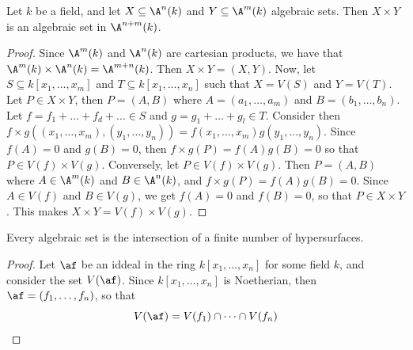 \begin{proposition}\label{1.2.4}
    Let $k$ be a field, and let  $X \subseteq \A^n(k)$ and $Y \subseteq \A^m(k)$
    algebraic sets. Then $X \times Y$ is an algebraic set in  $\A^{n+m}(k)$.
\end{proposition}
\begin{proof}
    Since $\A^m(k)$ and $\A^n(k)$ are cartesian products, we have that $\A^m(k)
    \times \A^n(k)=\A^{m+n}(k)$. Then $X \times Y=(X,Y)$. Now, let $S \subseteq
    k[x_1, \dots, x_m]$ and $T \subseteq k[x_1, \dots,x_n]$ such that $X=V(S)$
    and $Y=V(T)$. Let $P \in X \times Y$, then  $P=(A,B)$ where $A=(a_1, \dots,
    a_m)$ and $B=(b_1, \dots, b_n)$.  Let $f=f_1+\dots+f_d+\dots \in S$ and
    $g=g_1+\dots+g_l \in T$. Consider then $f \times
    g((x_1, \dots, x_m),(y_1, \dots, y_n))=f(x_1, \dots, x_m)g(y_1, \dots,
    y_n)$. Since $f(A)=0$ and $g(B)=0$, then $f \times g(P)=f(A)g(B)=0$ so that
    $P \in V(f) \times V(g)$. Conversely, let $P \in V(f) \times V(g)$. Then
    $P=(A,B)$ where $A \in \A^m(k)$ and $B \in \A^n(k)$, and $f \times
    g(P)=f(A)g(B)=0$. Since  $A \in V(f)$ and $B \in V(g)$, we get $f(A)=0$ and
    $f(B)=0$, so that $P \in X \times Y$. This makes  $X \times Y=V(f) \times
    V(g)$.
\end{proof}

\begin{theorem}\label{theorem_9.5.1}
  Every algebraic set is the intersection of a finite number of
  hypersurfaces.
\end{theorem}
\begin{proof}
  Let $\af$ be an iddeal in the ring $k[x_1, \dots, x_n]$ for some field $k$,
  and consider the set $V(\af)$. Since $k[x_1, \dots, x_n]$ is Noetherian,
  then $\af=(f_1, \dots, f_n)$, so that
  \begin{equation*}
    V(\af)=V(f_1) \cap \dots \cap V(f_n)
  \end{equation*}
\end{proof}
